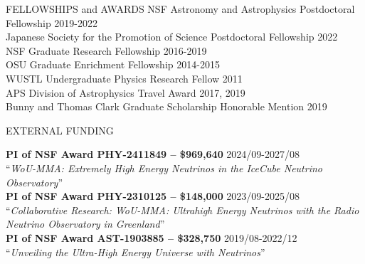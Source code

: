 \documentclass{resume} %
\begin{document}
\begin{rSection}{FELLOWSHIPS and AWARDS}
NSF Astronomy and Astrophysics Postdoctoral Fellowship \hfill 2019-2022 \\
Japanese Society for the Promotion of Science Postdoctoral Fellowship \hfill 2022 \\
NSF Graduate Research Fellowship \hfill 2016-2019 \\
OSU Graduate Enrichment Fellowship \hfill 2014-2015 \\
WUSTL Undergraduate Physics Research Fellow \hfill 2011 \\
APS Division of Astrophysics Travel Award \hfill 2017, 2019 \\
Bunny and Thomas Clark Graduate Scholarship Honorable Mention \hfill 2019


\end{rSection}

\begin{rSection}{EXTERNAL FUNDING}

\textbf{PI of NSF Award PHY-2411849 -- \$969,640} \hfill 2024/09-2027/08\\
``\textit{WoU-MMA: Extremely High Energy Neutrinos in the IceCube Neutrino Observatory}'' \\

\textbf{PI of NSF Award PHY-2310125 -- \$148,000} \hfill 2023/09-2025/08\\
``\textit{Collaborative Research: WoU-MMA: Ultrahigh Energy Neutrinos with the Radio Neutrino Observatory in Greenland}'' \\
  

\textbf{PI of NSF Award AST-1903885 -- \$328,750} \hfill 2019/08-2022/12\\
``\textit{Unveiling the Ultra-High Energy Universe with Neutrinos}'' \\


\end{rSection}
\end{document}
